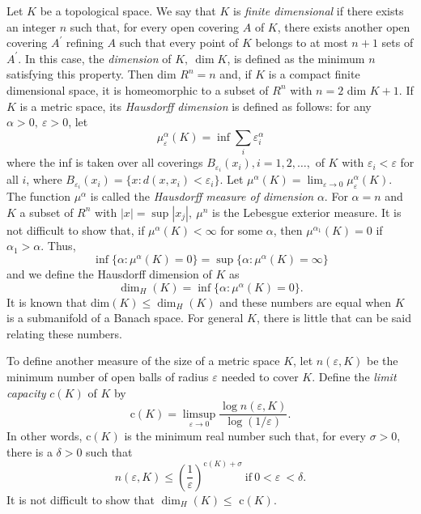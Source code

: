 \documentclass{surv-l}
\theoremstyle{plain}
\theoremstyle{definition}
\numberwithin{equation}{section}
\numberwithin{figure}{chapter}
\begin{document}
Let $K$ be a topological space. We say that $K$ is \emph{finite dimensional} if there exists an integer $n$ such that, for every open covering $A$ of $K$, there exists another open covering $A^{\prime}$ refining $A$ such that every point of $K$ belongs to at most $n+1$ sets of $A^{\prime}$. In this case, the \emph{dimension} of $K,\ \dim K$, is defined as the minimum $n$ satisfying this property. Then dim $R^{n}=n$ and, if $K$ is a compact finite dimensional space, it is homeomorphic to a subset of $R^{n}$ with $n=2$ dim $K+1$. If $K$ is a metric space, its \emph{Hausdorff dimension} is defined as follows: for any $\alpha>0,\ \varepsilon >0$, let
\begin{equation*}
\mu_{\varepsilon}^{\alpha}(K)=\inf\sum_{i} \varepsilon_{i}^{\alpha}
\end{equation*}
where the inf is taken over all coverings $B_{\varepsilon_{i}}(x_{i}), i=1,2,\ldots,$ of $K$ with $\varepsilon_{i}<\varepsilon$ for all $i$, where $B_{\varepsilon_i}(x_{i})=\{x:d(x, x_{i})<\varepsilon_{i}\}$. Let $\mu^{\alpha}(K)=\lim_{\varepsilon\rightarrow 0}\mu_{\varepsilon}^{\alpha}(K)$. The function $\mu^{\alpha}$ is called the \emph{Hausdorff measure of dimension} $\alpha$. For $\alpha=n$ and $K$ a subset of $R^{n}$ with $|x|=\sup|x_{j}|,\ \mu^{n}$ is the Lebesgue exterior measure. It is not difficult to show that, if $\mu^{\alpha}(K)<\infty$ for some $\alpha$, then $\mu^{\alpha_{1}}(K)=0$ if $\alpha_{1}>\alpha$. Thus,
\begin{equation*}
\inf\{\alpha\!:\mu^{\alpha}(K)=0\}=\sup\{\alpha\!:\mu^{\alpha}(K)=\infty\}
\end{equation*}
and we define the Hausdorff dimension of $K$ as
\begin{equation*}
\dim_{H}(K)=\inf\{\alpha\!:\mu^{\alpha}(K)=0\}.
\end{equation*}
It is known that dim$(K)\leq\dim_{H}(K)$ and these numbers are equal when $K$ is a submanifold of a Banach space. For general $K$, there is little that can be said relating these numbers.

To define another measure of the size of a metric space $K$, let $n(\varepsilon, K)$ be the minimum number of open balls of radius $\varepsilon$ needed to cover $K$. Define the \emph{limit capacity} $c(K)$ of $K$ by
\begin{equation*}
\mathrm{c}(K)=\limsup_{\varepsilon\rightarrow 0}\frac{\log n(\varepsilon, K)}{\log(1/\varepsilon)}.
\end{equation*}
In other words, c$(K)$ is the minimum real number such that, for every $\sigma>0$, there is a $\delta>0$ such that
\begin{equation*}
n(\varepsilon, K)\leq\left(\frac{1}{\varepsilon}\right)^{\mathrm{c}(K)+\sigma}\ \mathrm{if}\ 0<\varepsilon\ <\delta.
\end{equation*}
It is not difficult to show that $\dim_{H}(K)\leq$ c$(K)$.
\end{document}
